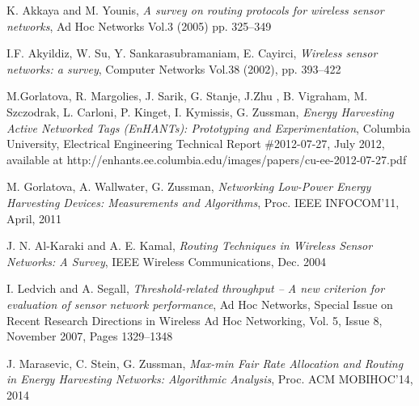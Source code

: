 \documentclass[12 pt]{article}
\newcommand{\debug}[1]{\mbox{\tt #1}}
\renewcommand{\debug}[1]{}              \newcommand{\cmd}[1]{}
\newcommand{\2}{\>\>}
\newcommand{\3}{\>\>\>}
\newcommand{\4}{\>\>\>\>}
\newcommand{\5}{\>\>\>\>\>}
\newcommand{\6}{\>\>\>\>\>\>}
\newcommand{\7}{\6\>}
\newcommand{\8}{\6\2}
\newcommand{\sname}{}
\newcounter{ctr}
\newcounter{protblock}
\newcounter{line}[protblock]
\begin{document}
\newpage
\renewcommand{\fname}{} \renewcommand{\sname}{}

\begin{thebibliography}{RMME09}

 K. Akkaya and M. Younis, \emph{A survey on routing protocols for wireless sensor networks}, Ad Hoc Networks Vol.3 (2005) pp. 325–349 \debug{[survey3]}

 I.F. Akyildiz, W. Su, Y. Sankarasubramaniam, E. Cayirci, \emph{Wireless sensor networks: a survey}, Computer Networks Vol.38 (2002), pp. 393–422 \debug{[Survey1]}

 M.Gorlatova, R. Margolies, J. Sarik, G. Stanje, J.Zhu , B. Vigraham, M. Szczodrak, L. Carloni, P. Kinget, I. Kymissis, G. Zussman, \emph{Energy Harvesting Active Networked Tags (EnHANTs): Prototyping and Experimentation}, Columbia University, Electrical Engineering Technical Report \#2012-07-27, July 2012, available at http://enhants.ee.columbia.edu/images/papers/cu-ee-2012-07-27.pdf \debug{[Columbia Tech Report]}

M. Gorlatova, A. Wallwater, G. Zussman,
\emph{Networking Low-Power Energy Harvesting Devices: Measurements and
  Algorithms},  Proc. IEEE INFOCOM'11, April, 2011 \debug{ [Infocom 2011]}

 J. N. Al-Karaki and A. E. Kamal, \emph{Routing Techniques in Wireless Sensor Networks: A Survey}, IEEE Wireless Communications, Dec. 2004 \debug{[survey2]}

 I. Ledvich and A. Segall, \emph{Threshold-related throughput – A new criterion for evaluation of sensor network performance}, Ad Hoc Networks, Special Issue on Recent Research Directions in Wireless Ad Hoc Networking, Vol. 5, Issue 8, November 2007, Pages 1329–1348 \debug{[Segall Ledvich]}

  J. Marasevic, C. Stein, G. Zussman, \emph{Max-min Fair Rate Allocation and Routing in Energy Harvesting Networks: Algorithmic Analysis}, Proc. ACM MOBIHOC'14, 2014 \debug{ [MSZ- MaxMin]}














\end{thebibliography}


\iffalse

[1] 	Power Scavenging Networked Nodes (PoSNeNs):
Design, Prototyping, and Experimentation
ACM SenSys’12 Submission #195

\fi
\end{document}
